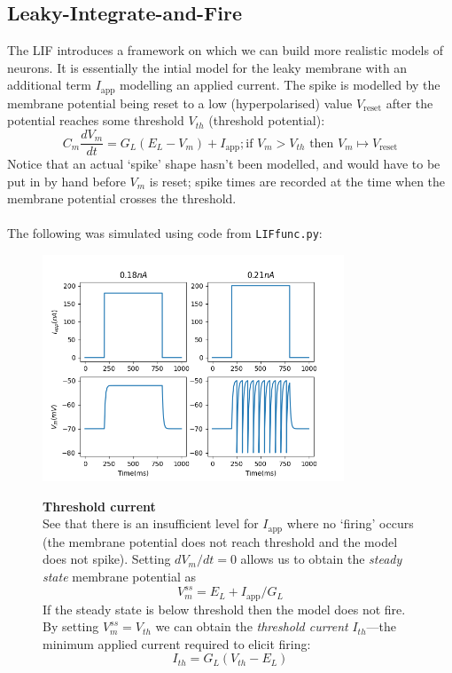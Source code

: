 \documentclass{report}
\begin{document}
\subsection{Leaky-Integrate-and-Fire}
The LIF introduces a framework on which we can build more realistic models of neurons. It is essentially the intial model
for the leaky membrane with an additional term $I_\text{app}$ modelling an applied current. The spike is modelled by the membrane potential being reset 
to a low (hyperpolarised) value $V_\text{reset}$
after the potential reaches some threshold $V_{th}$ (threshold potential):
\begin{equation*}
C_m\frac{dV_m}{dt}=G_L(E_L-V_m)+I_\text{app};\text{if $V_m>V_{th}$ then $V_m\mapsto V_\text{reset}$}
\end{equation*}
Notice that an actual `spike' shape hasn't been modelled, and would have to be put in by hand before $V_m$ is reset; spike times are recorded at the time when
the membrane potential crosses the threshold.\\
\vspace{1mm}\\
The following was simulated using code from \texttt{LIFfunc.py}:
\begin{figure}[h]
\begin{center}
\includegraphics[width=9cm]{3}\\
\end{center}
\textbf{Threshold current}\\
See that there is an insufficient level for $I_{\text{app}}$ where no `firing' occurs (the membrane potential does not reach threshold and the model does not spike).
Setting $dV_m/dt=0$ allows us to obtain the \textit{steady state} membrane potential as
\begin{equation*}
V^{ss}_m=E_L+I_{\text{app}}/G_L
\end{equation*}
If the steady state is below threshold then the model does not fire. By setting
$V^{ss}_m=V_{th}$ we can obtain the \textit{threshold current} $I_{th}$---the minimum applied
current required to elicit firing:
\begin{equation*}
I_{th}=G_L(V_{th}-E_L)
\end{equation*}
\end{figure}
\newpage
\end{document}

